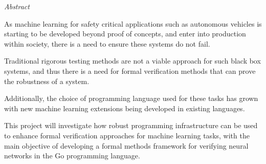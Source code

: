 \documentclass[11pt, oneside]{Thesis} %
\begin{document}
{\huge{\textit{Abstract}} \par}{ 

    As machine learning for safety critical applications such as autonomous vehicles is starting to be developed beyond proof of concepts, and enter into 
    production within society, there is a need to ensure these systems do not fail.

    Traditional rigorous testing methods are not a viable approach for such black box systems, and thus there is a need for formal verification methods that can 
    prove the robustness of a system.

    Additionally, the choice of programming language used for these tasks has grown with new machine learning extensions being developed in existing languages.

    This project will investigate how robust programming infrastructure can be used
    to enhance formal verification approaches for machine learning tasks, with the 
    main objective of developing a formal methods framework for verifying neural networks in the Go programming language.

    \clearpage %






    \pagestyle{fancy} %

    \tableofcontents %

}
\end{document}
